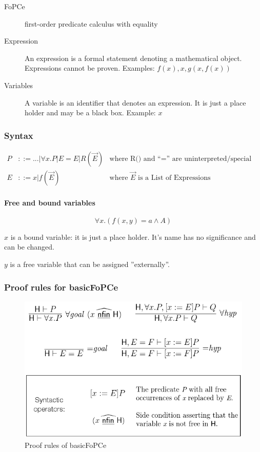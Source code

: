 \begin{description}
	\item[FoPCe] first-order predicate calculus with equality
	\item[Expression] An expression is a formal statement denoting a mathematical object. Expressions cannot be proven. Examples: $f(x), x, g(x, f(x))$
	\item[Variables] A variable is an identifier that denotes an expression. It is just a place holder and may be a black box. Example: $x$
\end{description}

\subsubsection{Syntax}
\begin{align*}
	P &::= ...| \forall x.P | E = E | R(\vec{E}) 
	& \text{where R() and “=” are uninterpreted/special relationship symbols}\\
	E &::= x | f(\vec{E})
	& \text{where $\vec{E}$ is a List of Expressions}
\end{align*}	

\paragraph{Free and bound variables} \[
	\forall x .(f(x,y) = a \land A)
\]

$x$ is a bound variable: it is just a place holder. It's name has no significance and can be changed.

$y$ is a free variable that can be assigned ''externally''.

\subsubsection{Proof rules for basicFoPCe}
\begin{figure}[H]
\centering
\includegraphics[width=0.7\linewidth]{images/basicfopce_proof_rules}
\caption{Proof rules of basicFoPCe}
\label{fig:basicfopceproofrules}
\end{figure}

